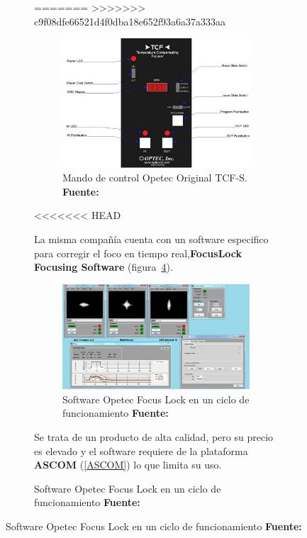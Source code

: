 \begin{itemize}
\begin{itemize}
\begin{figure}[h]
\begin{figure}[h]
=======
>>>>>>> c9f08dfe66521d4f0dba18e652f93a6a37a333aa

\begin{figure}[h]
\centering
\includegraphics[width=0.9\linewidth]{../images/optecinc_focuser}
\caption[Opetec Original TCF-S]{Mando de control Opetec Original TCF-S. \textbf{Fuente:} \cite{optec}}
\label{fig:optecinc_focuser}
\end{figure}

<<<<<<< HEAD

La misma compañía cuenta con un software especifico para corregir el foco en tiempo real,\textbf{FocusLock Focusing Software} (figura~\ref{fig:focus_lock}).

\begin{figure}[h]
\centering
\includegraphics[width=1\linewidth]{../images/focus_lock}
\caption[Opetec Focus Lock]{Software Opetec Focus Lock en un ciclo de funcionamiento \textbf{Fuente:} \cite{optec} }
\label{fig:focus_lock}
\end{figure}

Se trata de un producto de alta calidad, pero su precio es elevado y el software requiere de la plataforma \textbf{ASCOM} (\ref{ASCOM}) lo que limita su uso. 




\end{figure}
\end{figure}
\end{itemize}
\end{itemize}
